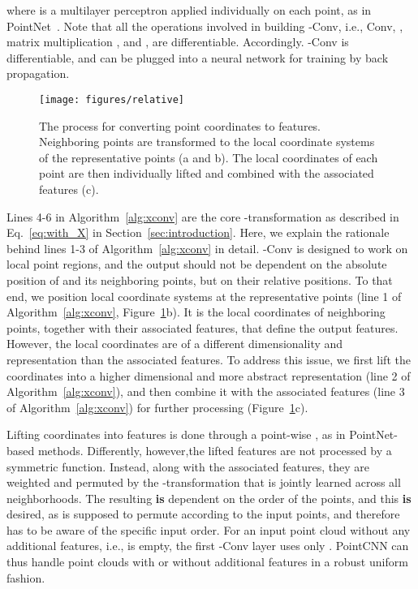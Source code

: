 \documentclass{article}
\begin{document}
where  is a multilayer perceptron applied individually on each point, as in PointNet~\cite{Qi_CVPR17}. Note that all the operations involved in building -Conv, i.e., Conv, , matrix multiplication , and , are differentiable. Accordingly. -Conv is differentiable, and can be plugged into a neural network for training by back propagation.

\begin{figure}[t!]
  \texttt{[image: figures/relative]}
  \caption{The process for converting point coordinates to features. Neighboring points are transformed to the local coordinate systems of the representative points (a and b). The local coordinates of each point are then individually lifted and combined with the associated features (c).}
  \label{fig:relative}
\end{figure}

Lines 4-6 in Algorithm~\ref{alg:xconv} are the core -transformation as described in Eq.~\ref{eq:with_X} in Section~\ref{sec:introduction}. Here, we explain the rationale behind lines 1-3 of Algorithm~\ref{alg:xconv} in detail. -Conv is designed to work on local point regions, and the output should not be dependent on the absolute position of  and its neighboring points, but on their relative positions. To that end, we position local coordinate systems at the representative points (line 1 of Algorithm~\ref{alg:xconv}, Figure~\ref{fig:relative}b). It is the local coordinates of neighboring points, together with their associated features, that define the output features. However, the local coordinates are of a different dimensionality and representation than the associated features. To address this issue, we first lift the coordinates into a higher dimensional and more abstract representation (line 2 of Algorithm~\ref{alg:xconv}), and then combine it with the associated features (line 3 of Algorithm~\ref{alg:xconv}) for further processing (Figure~\ref{fig:relative}c).

Lifting coordinates into features is done through a point-wise , as in PointNet-based methods. Differently, however,the lifted features are not processed by a symmetric function. Instead, along with the associated features, they are weighted and permuted by the -transformation that is jointly learned across all neighborhoods. The resulting  \textbf{is} dependent on the order of the points, and this \textbf{is} desired, as  is supposed to permute  according to the input points, and therefore has to be aware of the specific input order. For an input point cloud without any additional features, i.e.,  is empty, the first -Conv layer uses only .
PointCNN can thus handle point clouds with or without additional features in a robust uniform fashion.
\end{document}
